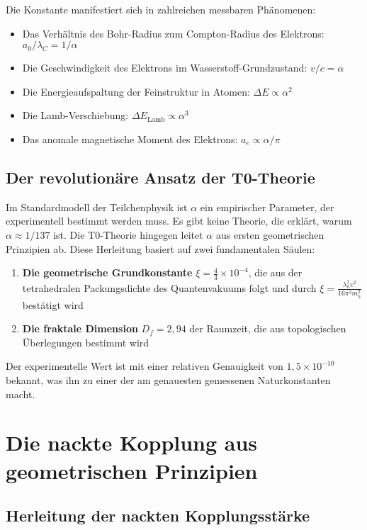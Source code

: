 \documentclass[12pt,a4paper]{article}
\theoremstyle{definition}
\begin{document}
	Die Konstante manifestiert sich in zahlreichen messbaren Phänomenen:
	\begin{itemize}
		\item Das Verhältnis des Bohr-Radius zum Compton-Radius des Elektrons: $a_0/\lambda_C = 1/\alpha$
		\item Die Geschwindigkeit des Elektrons im Wasserstoff-Grundzustand: $v/c = \alpha$
		\item Die Energieaufspaltung der Feinstruktur in Atomen: $\Delta E \propto \alpha^2$
		\item Die Lamb-Verschiebung: $\Delta E_{\mathrm{Lamb}} \propto \alpha^3$
		\item Das anomale magnetische Moment des Elektrons: $a_e \propto \alpha/\pi$
	\end{itemize}
	
	\subsection{Der revolutionäre Ansatz der T0-Theorie}
	
	Im Standardmodell der Teilchenphysik ist $\alpha$ ein empirischer Parameter, der experimentell bestimmt werden muss. Es gibt keine Theorie, die erklärt, warum $\alpha \approx 1/137$ ist. Die T0-Theorie hingegen leitet $\alpha$ aus ersten geometrischen Prinzipien ab. Diese Herleitung basiert auf zwei fundamentalen Säulen:
	
	\begin{enumerate}
		\item \textbf{Die geometrische Grundkonstante} $\xi = \frac{4}{3} \times 10^{-4}$, die aus der tetrahedralen Packungsdichte des Quantenvakuums folgt und durch $\xi = \frac{\lambda_h^2 v^2}{16\pi^3 m_h^2}$ bestätigt wird
		\item \textbf{Die fraktale Dimension} $D_f = 2{,}94$ der Raumzeit, die aus topologischen Überlegungen bestimmt wird
	\end{enumerate}
	
	Der experimentelle Wert ist mit einer relativen Genauigkeit von $1{,}5 \times 10^{-10}$ bekannt, was ihn zu einer der am genauesten gemessenen Naturkonstanten macht.
	
	\section{Die nackte Kopplung aus geometrischen Prinzipien}
	
	\subsection{Herleitung der nackten Kopplungsstärke}
	
\end{document}
